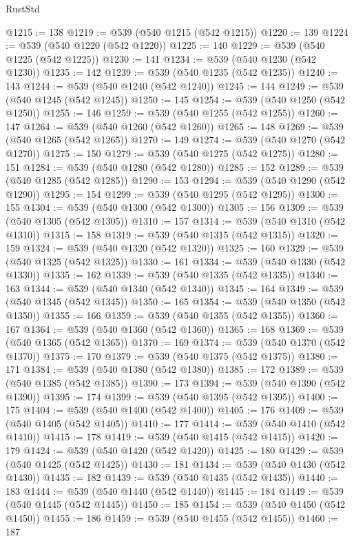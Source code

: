 \begin{lexlean}{RustStd}
\begin{coremodule}
@1215 := 138
@1219 := @539 (@540 @1215 (@542 @1215))
@1220 := 139
@1224 := @539 (@540 @1220 (@542 @1220))
@1225 := 140
@1229 := @539 (@540 @1225 (@542 @1225))
@1230 := 141
@1234 := @539 (@540 @1230 (@542 @1230))
@1235 := 142
@1239 := @539 (@540 @1235 (@542 @1235))
@1240 := 143
@1244 := @539 (@540 @1240 (@542 @1240))
@1245 := 144
@1249 := @539 (@540 @1245 (@542 @1245))
@1250 := 145
@1254 := @539 (@540 @1250 (@542 @1250))
@1255 := 146
@1259 := @539 (@540 @1255 (@542 @1255))
@1260 := 147
@1264 := @539 (@540 @1260 (@542 @1260))
@1265 := 148
@1269 := @539 (@540 @1265 (@542 @1265))
@1270 := 149
@1274 := @539 (@540 @1270 (@542 @1270))
@1275 := 150
@1279 := @539 (@540 @1275 (@542 @1275))
@1280 := 151
@1284 := @539 (@540 @1280 (@542 @1280))
@1285 := 152
@1289 := @539 (@540 @1285 (@542 @1285))
@1290 := 153
@1294 := @539 (@540 @1290 (@542 @1290))
@1295 := 154
@1299 := @539 (@540 @1295 (@542 @1295))
@1300 := 155
@1304 := @539 (@540 @1300 (@542 @1300))
@1305 := 156
@1309 := @539 (@540 @1305 (@542 @1305))
@1310 := 157
@1314 := @539 (@540 @1310 (@542 @1310))
@1315 := 158
@1319 := @539 (@540 @1315 (@542 @1315))
@1320 := 159
@1324 := @539 (@540 @1320 (@542 @1320))
@1325 := 160
@1329 := @539 (@540 @1325 (@542 @1325))
@1330 := 161
@1334 := @539 (@540 @1330 (@542 @1330))
@1335 := 162
@1339 := @539 (@540 @1335 (@542 @1335))
@1340 := 163
@1344 := @539 (@540 @1340 (@542 @1340))
@1345 := 164
@1349 := @539 (@540 @1345 (@542 @1345))
@1350 := 165
@1354 := @539 (@540 @1350 (@542 @1350))
@1355 := 166
@1359 := @539 (@540 @1355 (@542 @1355))
@1360 := 167
@1364 := @539 (@540 @1360 (@542 @1360))
@1365 := 168
@1369 := @539 (@540 @1365 (@542 @1365))
@1370 := 169
@1374 := @539 (@540 @1370 (@542 @1370))
@1375 := 170
@1379 := @539 (@540 @1375 (@542 @1375))
@1380 := 171
@1384 := @539 (@540 @1380 (@542 @1380))
@1385 := 172
@1389 := @539 (@540 @1385 (@542 @1385))
@1390 := 173
@1394 := @539 (@540 @1390 (@542 @1390))
@1395 := 174
@1399 := @539 (@540 @1395 (@542 @1395))
@1400 := 175
@1404 := @539 (@540 @1400 (@542 @1400))
@1405 := 176
@1409 := @539 (@540 @1405 (@542 @1405))
@1410 := 177
@1414 := @539 (@540 @1410 (@542 @1410))
@1415 := 178
@1419 := @539 (@540 @1415 (@542 @1415))
@1420 := 179
@1424 := @539 (@540 @1420 (@542 @1420))
@1425 := 180
@1429 := @539 (@540 @1425 (@542 @1425))
@1430 := 181
@1434 := @539 (@540 @1430 (@542 @1430))
@1435 := 182
@1439 := @539 (@540 @1435 (@542 @1435))
@1440 := 183
@1444 := @539 (@540 @1440 (@542 @1440))
@1445 := 184
@1449 := @539 (@540 @1445 (@542 @1445))
@1450 := 185
@1454 := @539 (@540 @1450 (@542 @1450))
@1455 := 186
@1459 := @539 (@540 @1455 (@542 @1455))
@1460 := 187

\end{coremodule}
\end{lexlean}
